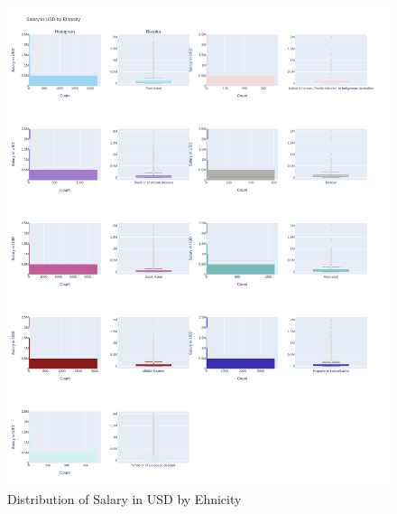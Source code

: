 \documentclass{article}
\begin{document}
\begin{figure}[ht]
    \centering
    \includegraphics[width=\textwidth]{images/salary_ethnicity_hist.pdf}
    \caption{Distribution of Salary in USD by Ehnicity}
    \label{fig:salarybyethnicityhist}
\end{figure}
\end{document}
